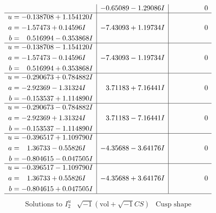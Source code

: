 \documentclass[1p]{elsarticle_modified}
\theoremstyle{definition}
\newcommand{\I}{\sqrt{-1}}
\begin{document}
$$\begin{array}{c|c|c}
 & -0.65089 - 1.29086 I & \phantom{-0.000000 } 0 \\ \hline\begin{aligned}
u &= -0.138708 + 1.154120 I \\
a &= -1.57473 + 0.14596 I \\
b &= \phantom{-}0.516994 - 0.353868 I\end{aligned}
 & -7.43093 + 1.19734 I & \phantom{-0.000000 } 0 \\ \hline\begin{aligned}
u &= -0.138708 - 1.154120 I \\
a &= -1.57473 - 0.14596 I \\
b &= \phantom{-}0.516994 + 0.353868 I\end{aligned}
 & -7.43093 - 1.19734 I & \phantom{-0.000000 } 0 \\ \hline\begin{aligned}
u &= -0.290673 + 0.784882 I \\
a &= -2.92369 - 1.31324 I \\
b &= -0.153537 + 1.114890 I\end{aligned}
 & \phantom{-}3.71183 + 7.16441 I & \phantom{-0.000000 } 0 \\ \hline\begin{aligned}
u &= -0.290673 - 0.784882 I \\
a &= -2.92369 + 1.31324 I \\
b &= -0.153537 - 1.114890 I\end{aligned}
 & \phantom{-}3.71183 - 7.16441 I & \phantom{-0.000000 } 0 \\ \hline\begin{aligned}
u &= -0.396517 + 1.109790 I \\
a &= \phantom{-}1.36733 - 0.55826 I \\
b &= -0.804615 - 0.047505 I\end{aligned}
 & -4.35688 - 3.64176 I & \phantom{-0.000000 } 0 \\ \hline\begin{aligned}
u &= -0.396517 - 1.109790 I \\
a &= \phantom{-}1.36733 + 0.55826 I \\
b &= -0.804615 + 0.047505 I\end{aligned}
 & -4.35688 + 3.64176 I & \phantom{-0.000000 } 0\\
 \hline 
 \end{array}$$\newpage$$\begin{array}{c|c|c}  
\text{Solutions to }I^u_{2}& \I (\text{vol} + \sqrt{-1}CS) & \text{Cusp shape}\\

\end{array}$$
\end{document}
